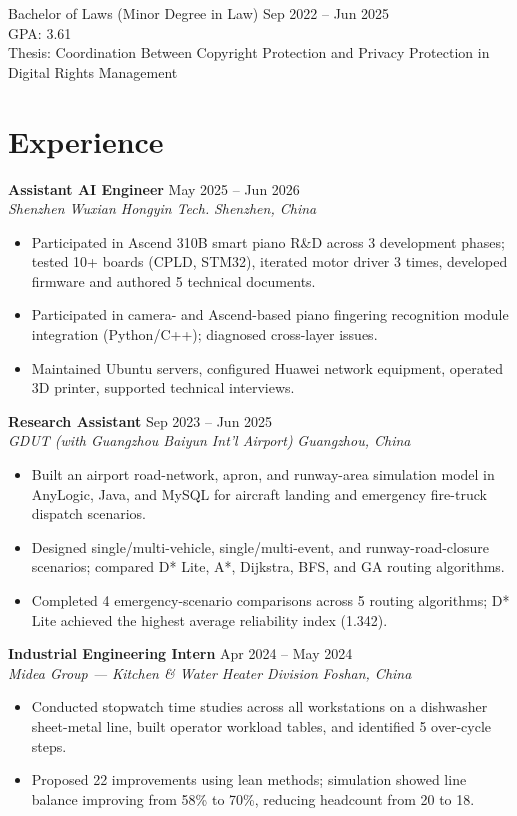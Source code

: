 \documentclass[10pt,a4paper]{article}
\newcommand{\resumeItem}[1]{\item #1}
\newcommand{\experienceEntry}[4]{%
  \textbf{#1} \hfill #2 \\
  \textit{#3} \hfill \textit{#4}
}
\begin{document}
\vspace{1pt}

{\small Bachelor of Laws (Minor Degree in Law)} \hfill Sep 2022 -- Jun 2025 \\
{\small GPA: 3.61} \\
{\small Thesis: Coordination Between Copyright Protection and Privacy Protection in Digital Rights Management}

\section{Experience}

\experienceEntry{Assistant AI Engineer}{May 2025 -- Jun 2026}{Shenzhen Wuxian Hongyin Tech.}{Shenzhen, China}
\begin{itemize}
  \resumeItem{Participated in Ascend 310B smart piano R\&D across 3 development phases; tested 10+ boards (CPLD, STM32), iterated motor driver 3 times, developed firmware and authored 5 technical documents.}
  \resumeItem{Participated in camera- and Ascend-based piano fingering recognition module integration (Python/C++); diagnosed cross-layer issues.}
  \resumeItem{Maintained Ubuntu servers, configured Huawei network equipment, operated 3D printer, supported technical interviews.}
\end{itemize}

\vspace{2pt}

\experienceEntry{Research Assistant}{Sep 2023 -- Jun 2025}{GDUT (with Guangzhou Baiyun Int'l Airport)}{Guangzhou, China}
\begin{itemize}
  \resumeItem{Built an airport road-network, apron, and runway-area simulation model in AnyLogic, Java, and MySQL for aircraft landing and emergency fire-truck dispatch scenarios.}
  \resumeItem{Designed single/multi-vehicle, single/multi-event, and runway-road-closure scenarios; compared D* Lite, A*, Dijkstra, BFS, and GA routing algorithms.}
  \resumeItem{Completed 4 emergency-scenario comparisons across 5 routing algorithms; D* Lite achieved the highest average reliability index (1.342).}
\end{itemize}

\vspace{2pt}

\experienceEntry{Industrial Engineering Intern}{Apr 2024 -- May 2024}{Midea Group — Kitchen \& Water Heater Division}{Foshan, China}
\begin{itemize}
  \resumeItem{Conducted stopwatch time studies across all workstations on a dishwasher sheet-metal line, built operator workload tables, and identified 5 over-cycle steps.}
  \resumeItem{Proposed 22 improvements using lean methods; simulation showed line balance improving from 58\% to 70\%, reducing headcount from 20 to 18.}
\end{itemize}
\end{document}
